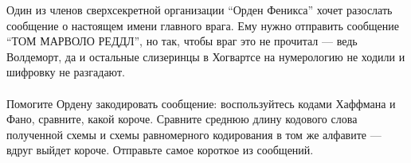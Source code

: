 \question
Один из членов сверхсекретной организации “Орден Феникса” хочет разослать сообщение о настоящем имени главного врага. Ему нужно отправить сообщение “ТОМ МАРВОЛО РЕДДЛ”, но так, чтобы враг это не прочитал — ведь Волдеморт, да и остальные слизеринцы в Хогвартсе на нумерологию не ходили и шифровку не разгадают.
\\
\\
Помогите Ордену закодировать сообщение: воспользуйтесь кодами Хаффмана и Фано, сравните, какой короче. Сравните среднюю длину кодового слова полученной схемы и схемы равномерного кодирования в том же алфавите — вдруг выйдет короче. Отправьте самое короткое из сообщений.